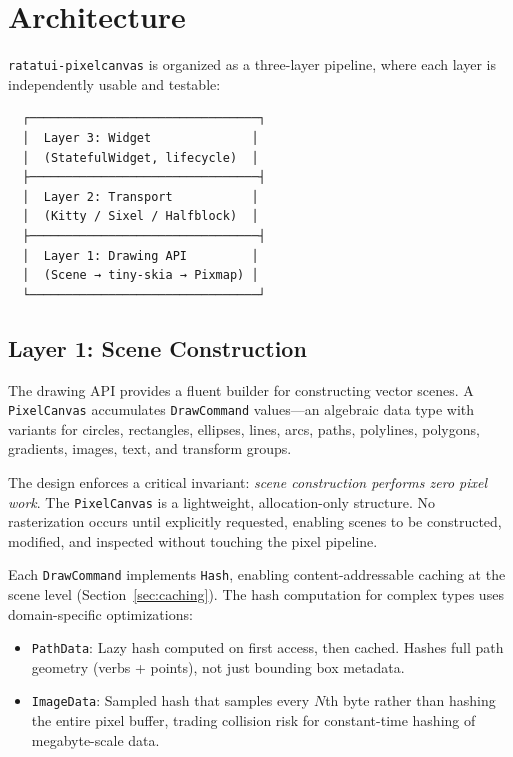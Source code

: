 \documentclass[11pt, a4paper, twocolumn]{article}
\begin{document}
\section{Architecture}
\label{sec:architecture}

\texttt{ratatui-pixelcanvas} is organized as a three-layer pipeline, where each layer is independently usable and testable:

\begin{verbatim}
  ┌────────────────────────────────┐
  │  Layer 3: Widget              │
  │  (StatefulWidget, lifecycle)  │
  ├────────────────────────────────┤
  │  Layer 2: Transport           │
  │  (Kitty / Sixel / Halfblock)  │
  ├────────────────────────────────┤
  │  Layer 1: Drawing API         │
  │  (Scene → tiny-skia → Pixmap) │
  └────────────────────────────────┘
\end{verbatim}

\subsection{Layer 1: Scene Construction}

The drawing API provides a fluent builder for constructing vector scenes.
A \texttt{PixelCanvas} accumulates \texttt{DrawCommand} values---an algebraic data type with variants for circles, rectangles, ellipses, lines, arcs, paths, polylines, polygons, gradients, images, text, and transform groups.

The design enforces a critical invariant: \emph{scene construction performs zero pixel work}.
The \texttt{PixelCanvas} is a lightweight, allocation-only structure.
No rasterization occurs until explicitly requested, enabling scenes to be constructed, modified, and inspected without touching the pixel pipeline.

Each \texttt{DrawCommand} implements \texttt{Hash}, enabling content-addressable caching at the scene level (Section~\ref{sec:caching}).
The hash computation for complex types uses domain-specific optimizations:

\begin{itemize}[leftmargin=1.2em, itemsep=0.1em]
    \item \texttt{PathData}: Lazy hash computed on first access, then cached. Hashes full path geometry (verbs + points), not just bounding box metadata.
    \item \texttt{ImageData}: Sampled hash that samples every $N$th byte rather than hashing the entire pixel buffer, trading collision risk for constant-time hashing of megabyte-scale data.
\end{itemize}
\end{document}
